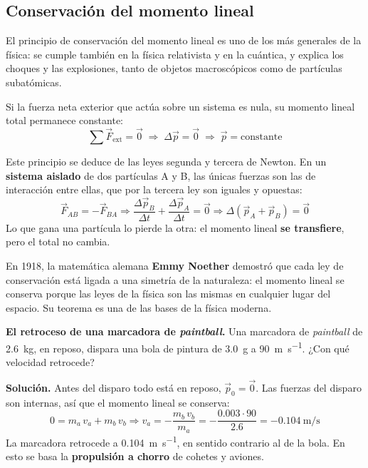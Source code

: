 \subsection{Conservación del momento lineal}

El principio de conservación del momento lineal es uno de los más generales de la física: se cumple también en la física relativista
y en la cuántica, y explica los choques y las explosiones, tanto de objetos macroscópicos como de partículas subatómicas.

\begin{definition}
    Si la fuerza neta exterior que actúa sobre un sistema es nula, su momento lineal total permanece constante:
    \[ \sum \vec{F}_{\text{ext}} = \vec{0} \;\Rightarrow\; \Delta\vec{p} = \vec{0} \;\Rightarrow\; \vec{p} = \text{constante} \]
\end{definition}

Este principio se deduce de las leyes segunda y tercera de Newton. En un \textbf{sistema aislado} de dos partículas A y B, las únicas
fuerzas son las de interacción entre ellas, que por la tercera ley son iguales y opuestas:
\[ \vec{F}_{AB} = -\vec{F}_{BA} \Rightarrow \frac{\Delta\vec{p}_B}{\Delta t} + \frac{\Delta\vec{p}_A}{\Delta t} = \vec{0}
\Rightarrow \Delta(\vec{p}_A + \vec{p}_B) = \vec{0} \]
Lo que gana una partícula lo pierde la otra: el momento lineal \textbf{se transfiere}, pero el total no cambia.

\begin{remark}
    En 1918, la matemática alemana \textbf{Emmy Noether} demostró que cada ley de conservación está ligada a una simetría de la
    naturaleza: el momento lineal se conserva porque las leyes de la física son las mismas en cualquier lugar del espacio. Su teorema
    es una de las bases de la física moderna.
\end{remark}

\begin{example}
    \textbf{El retroceso de una marcadora de \textit{paintball}.} Una marcadora de \textit{paintball} de \qty{2.6}{\kg}, en reposo,
    dispara una bola de pintura de \qty{3.0}{\g} a \qty{90}{\m\per\s}. ¿Con qué velocidad retrocede?

    \textbf{Solución.} Antes del disparo todo está en reposo, \(\vec{p}_0 = \vec{0}\). Las fuerzas del disparo son internas, así que
    el momento lineal se conserva:
    \[ 0 = m_a\,v_a + m_b\,v_b \Rightarrow v_a = -\frac{m_b\,v_b}{m_a} = -\frac{\num{0.003} \cdot 90}{\num{2.6}} = \qty{-0.104}{\m\per\s} \]
    La marcadora retrocede a \qty{0.104}{\m\per\s}, en sentido contrario al de la bola. En esto se basa la \textbf{propulsión a chorro}
    de cohetes y aviones.
\end{example}

